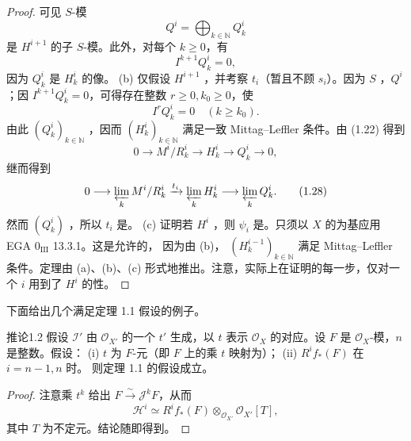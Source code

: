 \begin{proof}
可见 $S$-模
\[Q^i=\bigoplus_{k\in\mathbb N}Q^i_k\tag{1.24}\]
是 $H^{i+1}$ 的子 $S$-模。此外，对每个 $k\geq0$，有
\[I^{k+1}Q^i_k=0,\tag{1.25}\]
因为 $Q^i_k$ 是 $H^i_k$ 的像。
(b) 仅假设 $H^{i+1}$ ，并考察 $t_i$（暂且不顾 $s_i$）。因为 $S$ ，$Q^i$ ；因 $I^{k+1}Q^i_k=0$，可得存在整数 $r\geq0,k_0\geq0$，使
\[I^rQ^i_k=0\quad(k\geq k_0).\tag{1.26}\]
由此 $(Q^i_k)_{k\in\mathbb N}$ ，因而 $(H^i_k)_{k\in\mathbb N}$ 满足一致 Mittag--Leffler 条件。由 (1.22) 得到
\[0\longrightarrow M^i/R^i_k\longrightarrow H^i_k\longrightarrow Q^i_k\longrightarrow0,\tag{1.27}\]
继而得到
\[0\longrightarrow\varprojlim_k M^i/R^i_k\xrightarrow{t_i}\varprojlim_k H^i_k\longrightarrow\varprojlim_k Q^i_k.\tag{1.28}\]
然而 $(Q^i_k)$ ，所以 $t_i$ 是。
(c) 证明若 $H^i$ ，则 $\psi_i$ 是。只须以 $X$ 的为基应用 EGA $0_{\mathrm{III}}$ 13.3.1。这是允许的，
因为由 (b)， $(H^{i-1}_k)_{k\in\mathbb N}$ 满足 Mittag--Leffler 条件。定理由 (a)、(b)、(c) 形式地推出。注意，实际上在证明的每一步，仅对一个 $i$ 用到了 $H^i$ 的性。
\end{proof}
下面给出几个满足定理 1.1 假设的例子。
\begin{SGAresult}{推论}{1.2}
假设 $\mathcal I'$ 由 $\mathcal O_{X'}$ 的一个 $t'$ 生成，以 $t$ 表示 $\mathcal O_X$ 的对应。设 $F$ 是 $\mathcal O_X$-模，$n$ 是整数。假设：
(i) $t$ 为 $F$-元（即 $F$ 上的乘 $t$ 映射为）；
(ii) $R^if_*(F)$ 在 $i=n-1,n$ 时。
则定理 1.1 的假设成立。
\end{SGAresult}
\begin{proof}
注意乘 $t^k$ 给出 $F\xrightarrow\sim\mathcal J^kF$，从而
\[\mathcal H^i\simeq R^if_*(F)\otimes_{\mathcal O_{X'}}\mathcal O_{X'}[T],\tag{1.29}\]
其中 $T$ 为不定元。结论随即得到。
\end{proof}
